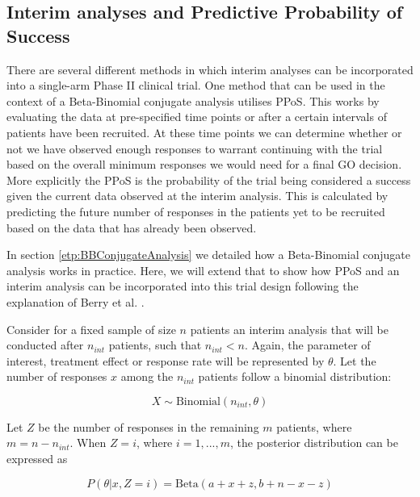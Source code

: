 
\subsection{Interim analyses and Predictive Probability of Success}

There are several different methods in which interim analyses can be incorporated into a single-arm Phase \RN{2} clinical trial. One method that can be used in the context of a Beta-Binomial conjugate analysis utilises PPoS. This works by evaluating the data at pre-specified time points or after a certain intervals of patients have been recruited. At these time points we can determine whether or not we have observed enough responses to warrant continuing with the trial based on the overall minimum responses we would need for a final GO decision. More explicitly the PPoS is the probability of the trial being considered a success given the current data observed at the interim analysis. This is calculated by predicting the future number of responses in the patients yet to be recruited based on the data that has already been observed. 

In section \ref{etp:BBConjugateAnalysis} we detailed how a Beta-Binomial conjugate analysis works in practice. Here, we will extend that to show how PPoS and an interim analysis can be incorporated into this trial design following the explanation of Berry et al. \cite{berryBayesianAdaptiveMethods2010}. 

Consider for a fixed sample of size $n$ patients an interim analysis that will be conducted after $n_{int}$ patients, such that $n_{int} < n$. Again, the parameter of interest, treatment effect or response rate will be represented by $\theta$. Let the number of responses $x$ among the $n_{int}$ patients follow a binomial distribution: 

\begin{equation}
	X \sim \text{Binomial}(n_{int},\theta) 
\end{equation}

Let $Z$ be the number of responses in the remaining $m$ patients, where $m = n - n_{int}$. When $Z = i$, where $i = 1, ..., m$, the posterior distribution can be expressed as 

\begin{equation}
	P(\theta|x,Z=i) = \text{Beta}(a+x+z, b+n-x-z)
\end{equation}


